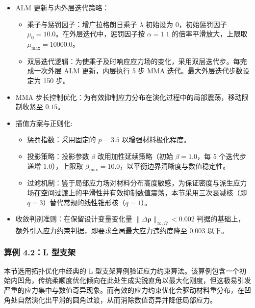 \begin{itemize}
	\item ALM 更新与内外层迭代策略：
	\begin{itemize}
		\item[$\circ$] 乘子与惩罚因子：增广拉格朗日乘子 $\lambda$ 初始设为 $0$，初始惩罚因子 $\mu_0 = 10.0$。在外层迭代中，惩罚因子按 $\alpha = 1.1$ 的倍率平滑放大，上限取 $\mu_{\max} = 10000.0$。
		
		\item[$\circ$] 双层迭代逻辑：为使乘子及时响应应力场的变化，采用双层迭代步。每完成一次外层 ALM 更新，内层执行 5 步 MMA 迭代。最大外层迭代步数设定为 150 步。
	\end{itemize}
	
	\item MMA 步长控制优化：为有效抑制应力分布在演化过程中的局部震荡，移动限制收紧至 $0.15$。
	
	\item 插值方案与正则化:
	\begin{itemize}
		\item[$\circ$] 惩罚指数：采用固定的 $p = 3.5$ 以增强材料极化程度。
		
		\item[$\circ$] 投影策略：投影参数 $\beta$ 改用加性延续策略（初始 $\beta = 1.0$，每 5 个迭代步递增 $1.0$），上限取 $\beta_{\max} = 10.0$，以平衡边界清晰度与数值稳定性。
		
		\item[$\circ$] 过滤机制：鉴于局部应力场对材料分布高度敏感，为保证密度与派生应力场在空间过渡上的平滑性并有效抑制数值震荡，本节采用三次衰减核（即 $q=3$）替代常规的线性锥形核（$q=1$）。
	\end{itemize}
	
	\item 收敛判别准则：在保留设计变量变化量 $\|\Delta \boldsymbol{\rho}\|_{\infty,\Omega} < 0.002$ 判据的基础上，额外引入应力约束判据，即要求全局最大应力违约度降至 $0.003$ 以下。
\end{itemize}


\subsubsection*{算例 4.2：L 型支架} 

本节选用拓扑优化中经典的 L 型支架算例验证应力约束算法。该算例包含一个初始内凹角，传统柔顺度优化倾向在此处生成尖锐直角以最大化刚度，但这极易引发严重的应力集中与数值奇异现象。而有效的应力约束优化会驱动材料重分布，在凹角处自然演化出平滑的圆角过渡，从而消除数值奇异并降低局部应力。

